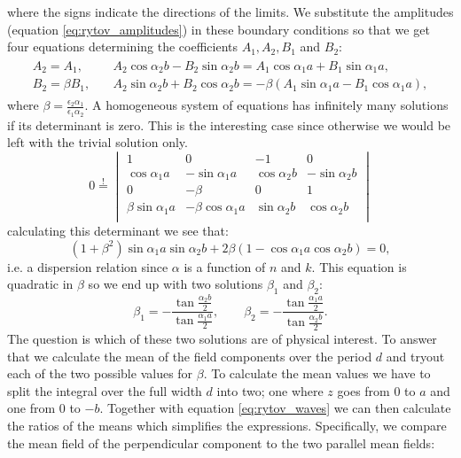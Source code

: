 where the signs indicate the directions of the limits. We substitute the amplitudes (equation \ref{eq:rytov_amplitudes}) in these boundary conditions so that we get four equations determining the coefficients $A_1,A_2,B_1$ and $B_2$:
\begin{align}
\begin{split}
    \label{eq:rytov_waves}
    A_2 = A_1, 
    \quad
    &A_2\cos \alpha_2 b - B_2 \sin \alpha_2 b= A_1 \cos \alpha_1 a + B_1 \sin \alpha_1 a,
    \\
    B_2=\beta B_1,
    \quad
    &A_2 \sin \alpha_2 b + B_2 \cos \alpha_2 b = -\beta (A_1 \sin \alpha_1 a - B_1 \cos \alpha_1 a),
\end{split}
\end{align}
where $\beta = \frac{\epsilon_2 \alpha_1}{\epsilon_1 \alpha_2}$. A homogeneous system of equations has infinitely many solutions if its determinant is zero. This is the interesting case since otherwise we would be left with the trivial solution only. 
\begin{equation}
   0\overset{!}{=}
   \begin{vmatrix} 
   1 & 0 & -1 & 0 \\
   \cos \alpha_1 a & -\sin \alpha_1 a & \cos \alpha_2 b & -\sin \alpha_2 b \\
   0 & -\beta & 0 & 1 \\
   \beta \sin \alpha_1 a & -\beta \cos \alpha_1 a & \sin \alpha_2 b & \cos \alpha_2 b \\
   \end{vmatrix} 
\end{equation}
calculating this determinant we see that:
\begin{equation}
    (1+\beta^2) \sin \alpha_1 a \sin \alpha_2 b + 2\beta (1-\cos \alpha_1 a \cos \alpha_2 b) = 0,
\end{equation}
i.e. a dispersion relation since $\alpha$ is a function of $n$ and $k$. This equation is quadratic in $\beta$ so we end up with two solutions $\beta_1$ and $\beta_2$:
\begin{equation}
    \beta_1 = -\frac{\tan \frac{\alpha_2 b}{2}}{\tan \frac{\alpha_1 a}{2}},
    \qquad
    \beta_2 = -\frac{\tan \frac{\alpha_1a}{2}}{\tan \frac{\alpha_2 b}{2}}.
\end{equation}
The question is which of these two solutions are of physical interest. To answer that we calculate the mean of the field components over the period $d$ and tryout each of the two possible values for $\beta$. To calculate the mean values we have to split the integral over the full width $d$ into two; one where $z$ goes from $0$ to $a$ and one from $0$ to $-b$. Together with equation \ref{eq:rytov_waves} we can then calculate the ratios of the means which simplifies the expressions. Specifically, we compare the mean field of the perpendicular component to the two parallel mean fields:
